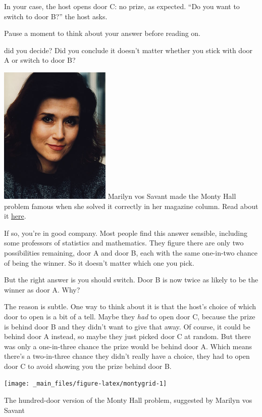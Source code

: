 \documentclass[justified]{tufte-book}
\begin{document}
In your case, the host opens door C: no prize, as expected. ``Do you want to switch to door B?'' the host asks.

Pause a moment to think about your answer before reading on.

 did you decide? Did you conclude it doesn't matter whether you stick with door A or switch to door B?

\begin{marginfigure}
\includegraphics{img/marilyn_vos_savant.png} Marilyn vos Savant made the
Monty Hall problem famous when she solved it correctly in her magazine
column. Read about it
\href{https://www.nytimes.com/1991/07/21/us/behind-monty-hall-s-doors-puzzle-debate-and-answer.html}{here}.
\end{marginfigure}

If so, you're in good company. Most people find this answer sensible, including some professors of statistics and mathematics. They figure there are only two possibilities remaining, door A and door B, each with the same one-in-two chance of being the winner. So it doesn't matter which one you pick.

But the right answer is you should switch. Door B is now twice as likely to be the winner as door A. Why?

The reason is subtle. One way to think about it is that the host's choice of which door to open is a bit of a tell. Maybe they \emph{had} to open door C, because the prize is behind door B and they didn't want to give that away. Of course, it could be behind door A instead, so maybe they just picked door C at random. But there was only a one-in-three chance the prize would be behind door A. Which means there's a two-in-three chance they didn't really have a choice, they had to open door C to avoid showing you the prize behind door B.

\begin{marginfigure}
\texttt{[image: \_main\_files/figure-latex/montygrid-1]} \caption[The hundred-door version of the Monty Hall problem, suggested by Marilyn vos Savant]{The hundred-door version of the Monty Hall problem, suggested by Marilyn vos Savant}\label{fig:montygrid}
\end{marginfigure}
\end{document}
